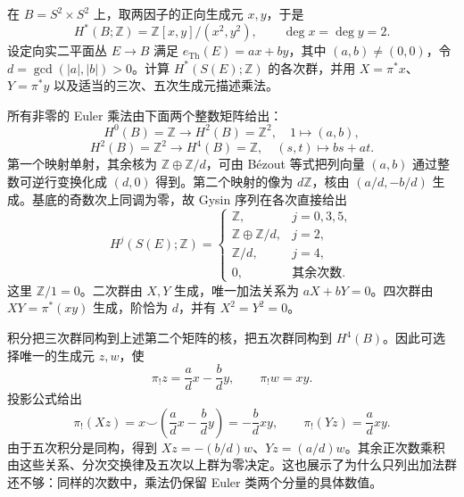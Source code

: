 \begin{exercise}\label{g2:ex:gysin-sphere-product-base}
	在 \(B=S^2\times S^2\) 上，取两因子的正向生成元 \(x,y\)，于是
	\[
		H^*(B;\mathbb Z)=\mathbb Z[x,y]/(x^2,y^2),\qquad\deg x=\deg y=2.
	\]
	设定向实二平面丛 \(E\to B\) 满足 \(e_{\mathrm{Th}}(E)=ax+by\)，其中 \((a,b)\ne(0,0)\)，令 \(d=\gcd(|a|,|b|)>0\)。计算 \(H^*(S(E);\mathbb Z)\) 的各次群，并用 \(X=\pi^*x\)、\(Y=\pi^*y\) 以及适当的三次、五次生成元描述乘法。
\end{exercise}
\begin{solution}
	所有非零的 Euler 乘法由下面两个整数矩阵给出：
	\[
		H^0(B)=\mathbb Z\longrightarrow H^2(B)=\mathbb Z^2,\quad 1\longmapsto(a,b),
	\]
	\[
		H^2(B)=\mathbb Z^2\longrightarrow H^4(B)=\mathbb Z,\quad (s,t)\longmapsto bs+at.
	\]
	第一个映射单射，其余核为 \(\mathbb Z\oplus\mathbb Z/d\)，可由 Bézout 等式把列向量 \((a,b)\) 通过整数可逆行变换化成 \((d,0)\) 得到。第二个映射的像为 \(d\mathbb Z\)，核由 \((a/d,-b/d)\) 生成。基底的奇数次上同调为零，故 Gysin 序列在各次直接给出
	\[
		H^j(S(E);\mathbb Z)=
		\begin{cases}
			\mathbb Z,&j=0,3,5,\\
			\mathbb Z\oplus\mathbb Z/d,&j=2,\\
			\mathbb Z/d,&j=4,\\
			0,&\text{其余次数}.
		\end{cases}
	\]
	这里 \(\mathbb Z/1=0\)。二次群由 \(X,Y\) 生成，唯一加法关系为 \(aX+bY=0\)。四次群由 \(XY=\pi^*(xy)\) 生成，阶恰为 \(d\)，并有 \(X^2=Y^2=0\)。

	积分把三次群同构到上述第二个矩阵的核，把五次群同构到 \(H^4(B)\)。因此可选择唯一的生成元 \(z,w\)，使
	\[
		\pi_!z=\frac adx-\frac bdy,\qquad \pi_!w=xy.
	\]
	投影公式给出
	\[
		\pi_!(Xz)=x\smile\left(\frac adx-\frac bdy\right)=-\frac bdxy,\qquad
		\pi_!(Yz)=\frac adxy.
	\]
	由于五次积分是同构，得到 \(Xz=-(b/d)w\)、\(Yz=(a/d)w\)。其余正次数乘积由这些关系、分次交换律及五次以上群为零决定。这也展示了为什么只列出加法群还不够：同样的次数中，乘法仍保留 Euler 类两个分量的具体数值。
\end{solution}

